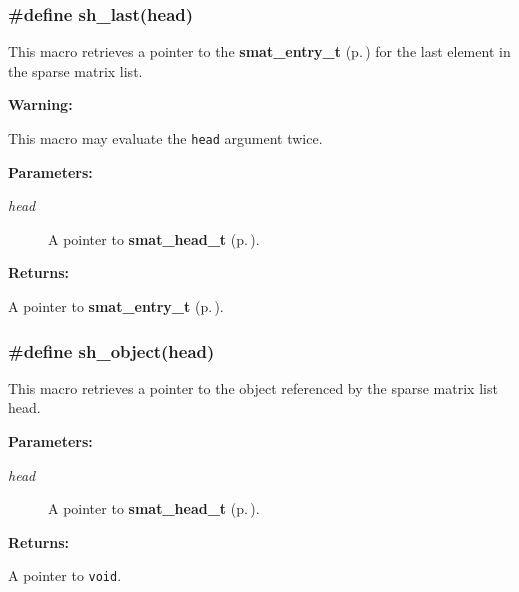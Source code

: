 \subsubsection{\setlength{\rightskip}{0pt plus 5cm}\#define sh\_\-last(head)}\label{group__dbprim__smat_a36}




 This macro retrieves a pointer to the {\bf smat\_\-entry\_\-t} {\rm (p.\,\pageref{group__dbprim__smat_a2})} for the last element in the sparse matrix list.

\begin{Desc}
\item[{\bf Warning: }]\par
This macro may evaluate the {\tt head} argument twice.\end{Desc}
\begin{Desc}
\item[{\bf Parameters: }]\par
\begin{description}
\item[
{\em head}]A pointer to {\bf smat\_\-head\_\-t} {\rm (p.\,\pageref{group__dbprim__smat_a1})}.

\end{description}
\end{Desc}
\begin{Desc}
\item[{\bf Returns: }]\par
A pointer to {\bf smat\_\-entry\_\-t} {\rm (p.\,\pageref{group__dbprim__smat_a2})}. \end{Desc}
\subsubsection{\setlength{\rightskip}{0pt plus 5cm}\#define sh\_\-object(head)}\label{group__dbprim__smat_a37}




 This macro retrieves a pointer to the object referenced by the sparse matrix list head.\begin{Desc}
\item[{\bf Parameters: }]\par
\begin{description}
\item[
{\em head}]A pointer to {\bf smat\_\-head\_\-t} {\rm (p.\,\pageref{group__dbprim__smat_a1})}.

\end{description}
\end{Desc}
\begin{Desc}
\item[{\bf Returns: }]\par
A pointer to {\tt void}. \end{Desc}
